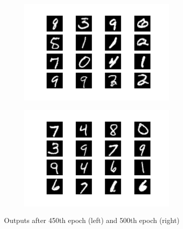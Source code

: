 \documentclass{article}
\begin{document}
\begin{appendices}
\begin{figure}[H]
\centering
\begin{subfigure}{.5\textwidth}
  \centering
  \includegraphics[width=3in]{csci-8110/hw-4/images/generated_plot_e450.png}
  \label{fig:ep20}
\end{subfigure}%
\begin{subfigure}{.5\textwidth}
  \centering
  \includegraphics[width=3in]{csci-8110/hw-4/images/generated_plot_e500.png}
  \label{fig:ep100_2}
\end{subfigure}
\caption{Outputs after 450th epoch (left) and 500th epoch (right)}
\label{fig:ep20-100}
\end{figure}


\end{appendices}
\end{document}
